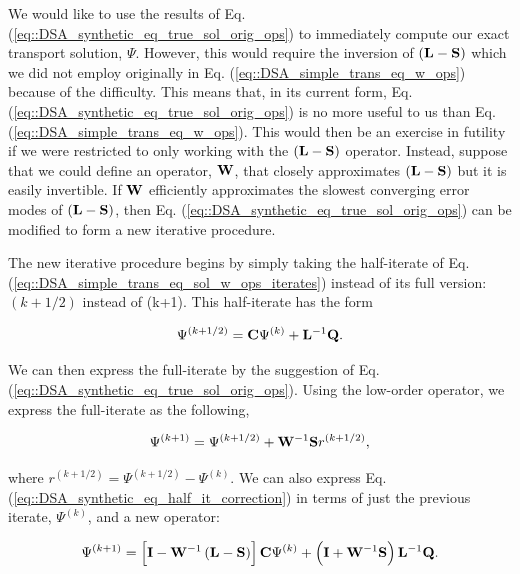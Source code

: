 We would like to use the results of Eq. (\ref{eq::DSA_synthetic_eq_true_sol_orig_ops}) to immediately compute our exact transport solution, $\Psi$. However, this would require the inversion of $\left(  {\bf L} - {\bf S}  \right)$ which we did not employ originally in Eq. (\ref{eq::DSA_simple_trans_eq_w_ops}) because of the difficulty. This means that, in its current form, Eq. (\ref{eq::DSA_synthetic_eq_true_sol_orig_ops}) is no more useful to us than Eq. (\ref{eq::DSA_simple_trans_eq_w_ops}). This would then be an exercise in futility if we were restricted to only working with the $\left(  {\bf L} - {\bf S}  \right)$ operator. Instead, suppose that we could define an operator, ${\bf W}$, that closely approximates $\left(  {\bf L} - {\bf S}  \right)$ but it is easily invertible. If ${\bf W}$ efficiently approximates the slowest converging error modes of $\left(  {\bf L} - {\bf S}  \right)$, then Eq. (\ref{eq::DSA_synthetic_eq_true_sol_orig_ops}) can be modified to form a new iterative procedure.

The new iterative procedure begins by simply taking the half-iterate of Eq. (\ref{eq::DSA_simple_trans_eq_sol_w_ops_iterates}) instead of its full version: ${(k+1/2)}$ instead of {(k+1)}. This half-iterate has the form

\begin{equation}
\label{eq::DSA_synthetic_eq_half_it}
\Psi^{(k+1/2)} = {\bf C} \Psi^{(k)} + {\bf L}^{-1} {\bf Q}.
\end{equation}

\noindent We can then express the full-iterate by the suggestion of Eq. (\ref{eq::DSA_synthetic_eq_true_sol_orig_ops}). Using the low-order operator, we express the full-iterate as the following,

\begin{equation}
\label{eq::DSA_synthetic_eq_half_it_correction}
\Psi^{(k+1)} =\Psi^{(k+1/2)} + {\bf W}^{-1} {\bf S}  r^{(k+1/2)},
\end{equation}

\noindent where $r^{(k+1/2)} = \Psi^{(k+1/2)} - \Psi^{(k)}$. We can also express Eq. (\ref{eq::DSA_synthetic_eq_half_it_correction}) in terms of just the previous iterate, $\Psi^{(k)}$, and a new operator:

\begin{equation}
\label{eq::DSA_synthetic_eq_new_algo}
\Psi^{(k+1)} = \left[  {\bf I} - {\bf W}^{-1} \left(  {\bf L} - {\bf S}  \right)  \right] {\bf C} \Psi^{(k)} + \left({\bf I} + {\bf W}^{-1} {\bf S} \right) {\bf L}^{-1} {\bf Q} .
\end{equation}

